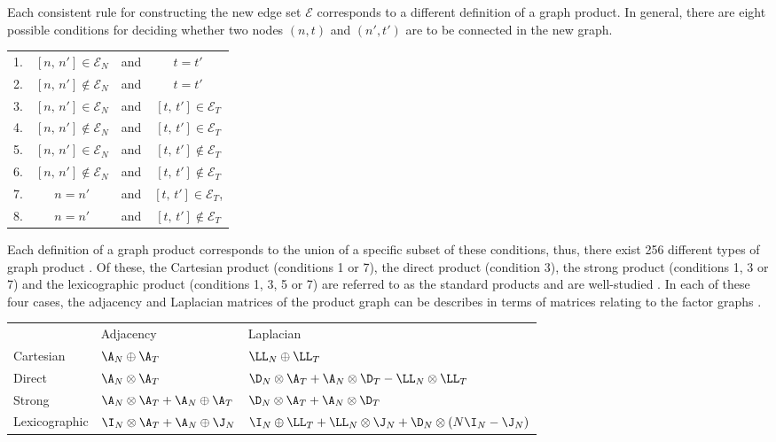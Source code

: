 Each consistent rule for constructing the new edge set $\mathcal{E}$ corresponds to a different definition of a graph product. In general, there are eight possible conditions for deciding whether two nodes $(n, t)$ and $(n', t')$ are to be connected in the new graph.

\begin{table}[h]
\def\arraystretch{1.5}
\centering
\begin{tabular}{lclc}
1. & $[n, \, n'] \in \mathcal{E}_N$ & and &  $t = t'$  \\
2. & $[n, \, n'] \notin \mathcal{E}_N$  & and &  $t = t'$  \\
3. & $[n, \, n'] \in \mathcal{E}_N$ & and &  $[t, \, t'] \in \mathcal{E}_T$ \\
4. & $[n, \, n'] \notin \mathcal{E}_N$ & and &  $[t, \, t'] \in \mathcal{E}_T$  \\
5. & $[n, \, n'] \in \mathcal{E}_N$ & and & $[t, \, t'] \notin \mathcal{E}_T$  \\
6. & $[n, \, n'] \notin \mathcal{E}_N$ & and & $[t, \, t'] \notin \mathcal{E}_T$  \\
7. & $n = n'$ & and & $[t, \, t'] \in \mathcal{E}_T$,  \\
8. & $n = n'$ & and &  $[t, \, t'] \notin \mathcal{E}_T$ 
\end{tabular}
\end{table}



Each definition of a graph product corresponds to the union of a specific subset of these conditions, thus, there exist 256 different types of graph product \citep{Barik2015}. Of these, the Cartesian product (conditions 1 or 7), the direct product (condition 3), the strong product (conditions 1, 3 or 7) and the lexicographic product (conditions 1, 3, 5 or 7) are referred to as the standard products and are well-studied \citep{Imrich2000}. In each of these four cases, the adjacency and Laplacian matrices of the product graph can be describes in terms of matrices relating to the factor graphs \citep{Barik2015, Barik2018}. 

\begin{table}[h]
\def\arraystretch{1.8}
\centering
\begin{tabular}{lll}

    & Adjacency 
    & Laplacian \\

    Cartesian 
    & $\A_N \oplus \A_T$ 
    & $\LL_N \oplus \LL_T$ \\

    Direct 
    & $\A_N \otimes \A_T$  
    & $\D_N \otimes \A_T + \A_N \otimes \D_T - \LL_N \otimes \LL_T$ \\
    
    Strong 
    & $\A_N \otimes \A_T + \A_N \oplus \A_T$ 
    & $\D_N \otimes \A_T + \A_N \otimes \D_T $ \\

    Lexicographic 
    & $\I_N \otimes \A_T + \A_N \oplus \J_N$ 
    &  $\I_N \oplus \LL_T + \LL_N \otimes \J_N + \D_N \otimes (N \I_N - \J_N)$ 

\end{tabular}
\end{table}



